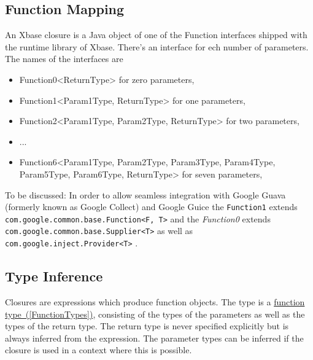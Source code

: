 \documentclass[a4paper,10pt]{scrreprt}
\newlength{\itemindentlen}
\begin{document}
\subsection{Function Mapping\label{FunctionMapping}}
An Xbase closure is a Java object of one of the Function interfaces shipped with the runtime library of Xbase. There's an interface for ech number of parameters.
The names of the interfaces are 

\setlength{\itemindentlen}{\textwidth}
\begin{itemize}
\addtolength{\itemindentlen}{-2em}

\item \begin{minipage}[t]{\itemindentlen}
Function0<ReturnType> for zero parameters, 
\end{minipage}

\item \begin{minipage}[t]{\itemindentlen}
Function1<Param1Type, ReturnType> for one parameters, 
\end{minipage}

\item \begin{minipage}[t]{\itemindentlen}
Function2<Param1Type, Param2Type, ReturnType> for two parameters, 
\end{minipage}

\item \begin{minipage}[t]{\itemindentlen}
... 
\end{minipage}

\item \begin{minipage}[t]{\itemindentlen}
Function6<Param1Type, Param2Type, Param3Type, Param4Type, Param5Type, Param6Type, ReturnType> for seven parameters, 
\end{minipage}

\end{itemize}
\addtolength{\itemindentlen}{2em}


To be discussed: In order to allow seamless integration with Google Guava (formerly known as Google Collect) and Google Guice the \lstinline{Function1}
 extends \lstinline{com.google.common.base.Function<F, T>}
 and the
\emph{Function0} extends \lstinline{com.google.common.base.Supplier<T>}
 as well as \lstinline{com.google.inject.Provider<T>}
.




\subsection{Type Inference\label{ClosuresTypeInference}}
Closures are expressions which produce function objects. The type is a 
\hyperref[FunctionTypes]{function type~(\ref*{FunctionTypes})}, consisting of the types of the parameters as well as the types of the return type.
The return type is never specified explicitly but is always inferred from the expression. The parameter types can be inferred if the closure is used in a context where this is possible.
\end{document}
